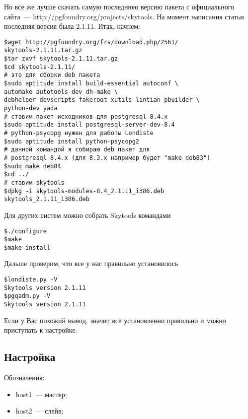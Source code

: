 Но все же лучше скачать самую последнюю версию пакета с официального сайта~--- http://pgfoundry.org/projects/skytools. 
На момент написания статьи последняя версия была 2.1.11. Итак, начнем:

\begin{verbatim}
$wget http://pgfoundry.org/frs/download.php/2561/
skytools-2.1.11.tar.gz
$tar zxvf skytools-2.1.11.tar.gz
$cd skytools-2.1.11/
# это для сборки deb пакета
$sudo aptitude install build-essential autoconf \ 
automake autotools-dev dh-make \ 
debhelper devscripts fakeroot xutils lintian pbuilder \
python-dev yada
# ставим пакет исходников для postgresql 8.4.x
$sudo aptitude install postgresql-server-dev-8.4
# python-psycopg нужен для работы Londiste
$sudo aptitude install python-psycopg2
# данной командой я собираю deb пакет для 
# postgresql 8.4.x (для 8.3.x например будет "make deb83")
$sudo make deb84
$cd ../
# ставим skytools
$dpkg -i skytools-modules-8.4_2.1.11_i386.deb 
skytools_2.1.11_i386.deb
\end{verbatim}

Для других систем можно собрать Skytools командами 

\begin{verbatim}
$./configure
$make
$make install
\end{verbatim}

Дальше проверим, что все у нас правильно установилось
\begin{verbatim}
$londiste.py -V
Skytools version 2.1.11
$pgqadm.py -V
Skytools version 2.1.11
\end{verbatim}

Если у Вас похожий вывод, значит все установленно правильно и можно приступать к настройке.


\subsection{Настройка}
Обозначения: 
\begin{itemize}
\item host1~--- мастер; 
\item host2~--- слейв;
\end{itemize}


